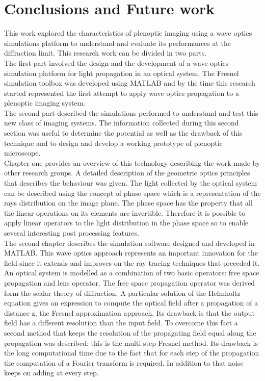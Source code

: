 \chapter{Conclusions and Future work}
This work explored the characteristics of plenoptic imaging using a wave optics simulations platform to understand and evaluate its performances at the diffraction limit.
This research work can be divided in two parts. \\
The first part involved the design and the development of a wave optics simulation platform for light propagation in an optical system. The Fresnel simulation toolbox was developed using MATLAB and by the time this research started represented the first attempt to apply wave optics propagation to a plenoptic imaging system.\\ 
The second part described the simulations performed to understand and test this new class of imaging systems. The information collected during this
second section was useful to determine the potential as well as the drawback of
this technique and to design and develop a working prototype of plenoptic microscope. \\ 
Chapter one provides an overview of this technology describing the work made by other research groups. A detailed description of the geometric optics principles that describes the behaviour was given. The light collected by the optical system can be described using the concept of phase space which is a representation of the rays distribution on the image plane. The phase space has the property that all the linear operations on its elements are invertible. Therefore it is possible to apply linear operators to the light distribution in the phase space so to enable several interesting post processing features.\\
The second chapter describes the simulation software designed and developed in MATLAB. This wave optics approach represents an important innovation for the field since it extends and improves on the ray tracing techniques that preceded it. An optical system is modelled as a combination of two basic operators: free space propagation and lens operator. The free space propagation operator was derived form the scalar theory of diffraction. A particular solution of the Helmholtz equation gives an expression to compute the optical field after a propagation of a distance z, the Fresnel approximation approach. Its drawback is that the output field has a different resolution than the input field. To overcome this fact a second method that keeps the resolution of the propagating field equal along the propagation was described: this is the multi step Fresnel method. Its drawback is the long computational time due to the fact that for each step of the propagation the computation of a Fourier transform is required. In addition to that noise keeps on adding at every step.\\
